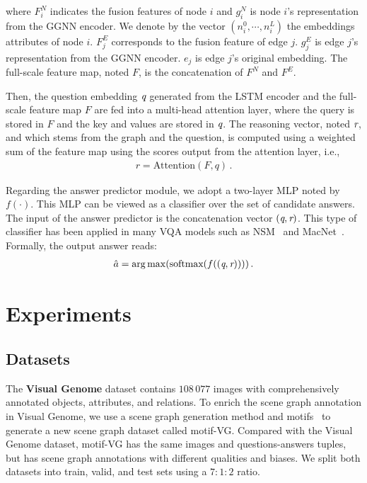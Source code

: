 \documentclass[letterpaper]{article} %
\begin{document}
where $F_i^N$ indicates the fusion features of node $i$ and $g_i^N$ is node $i$'s representation from the GGNN encoder. 
We denote by the vector $(n_i^0, \cdots,n_i^L)$ the embeddings attributes of node $i$. 
$F_j^E$ corresponds to the fusion feature of edge $j$. $g_j^E$ is edge $j$'s representation from the GGNN encoder. 
$e_j$ is edge $j$'s original embedding. 
The full-scale feature map, noted $F$, is the concatenation of $F^N$ and $F^E$.

Then, the question embedding $\emph{q}$ generated from the LSTM encoder and the full-scale feature map $F$ are fed into a multi-head attention layer, where the query is stored in $F$ and the key and values are stored in $\emph{q}$.
The reasoning vector, noted $\emph{r}$, and which stems from the graph and the question, is computed using a weighted sum of the feature map using the scores output from the attention layer, i.e.,
\begin{gather}
    r = \text{Attention}(F, q) \, .
\end{gather}

Regarding the answer predictor module, we adopt a two-layer MLP noted by $f(\cdot)$. 
This MLP can be viewed as a classifier over the set of candidate answers. 
The input of the answer predictor is the concatenation vector $(\emph{q},\emph{r})$. 
This type of classifier has been applied in many VQA models such as NSM~\cite{DBLP:conf/nips/HudsonM19} and MacNet~\cite{DBLP:conf/nips/LuYBP16}.
Formally, the output answer reads:
\begin{gather}
    \hat{a} = \mathop{\arg\max}(\text{softmax}(f((\emph{q},\emph{r}))))\, .
\end{gather}



\section{Experiments}\label{sec:experiments}

\subsection{Datasets}

\quad The \textbf{Visual Genome} dataset contains $108 \, 077$ images with comprehensively annotated objects, attributes, and relations. To enrich the scene graph annotation in Visual Genome, we use a scene graph generation method and motifs~\cite{DBLP:conf/cvpr/ZellersYTC18} to generate a new scene graph dataset called motif-VG. 
Compared with the Visual Genome dataset, motif-VG has the same images and questions-answers tuples, but has scene graph annotations with different qualities and biases. 
We split both datasets into train, valid, and test sets using a $7:1:2$ ratio. 
\end{document}
